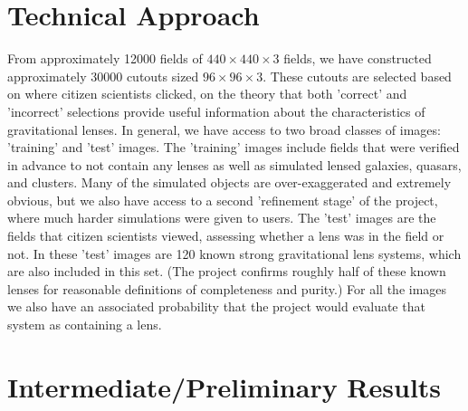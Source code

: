 \documentclass[10pt,twocolumn,letterpaper]{article}
\begin{document}
\section{Technical Approach}

From approximately 12000 fields of $440\times440\times3$ fields, we have
constructed approximately 30000 cutouts sized $96\times96\times3$. These cutouts
are selected based on where citizen scientists clicked, on the theory that both
'correct' and 'incorrect' selections provide useful information about the
characteristics of gravitational lenses. In general, we have access to two
broad classes of images: 'training' and 'test' images. The 'training' images
include fields that were verified in advance to not contain any lenses as well
as simulated lensed galaxies, quasars, and clusters. Many of the simulated
objects are over-exaggerated and extremely obvious, but we also have access to
a second 'refinement stage' of the project, where much harder simulations were
given to users. The 'test' images are the fields that citizen scientists
viewed, assessing whether a lens was in the field or not. In these 'test'
images are 120 known strong gravitational lens systems, which are also included
in this set. (The project confirms roughly half of these known lenses for
reasonable definitions of completeness and purity.) For all the images we also
have an associated probability that the project would evaluate that system as
containing a lens.

\section{Intermediate/Preliminary Results}


% 
% 
\end{document}
